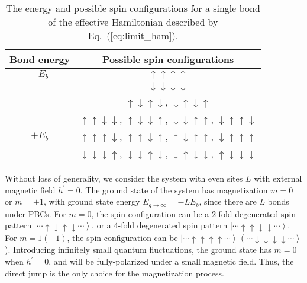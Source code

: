 \documentclass[article,10pt,onecolumn,superscriptaddress,floatfix]{revtex4}
\begin{document}
\begin{table}
\centering
\begin{tabular}{c|c}
\hline
Bond energy & Possible spin configurations \tabularnewline
\hline
\hline
$-E_{b}$ & $\uparrow\uparrow\uparrow\uparrow$ \tabularnewline
\cline{2-2}
 & $\downarrow\downarrow\downarrow\downarrow$\tabularnewline
\cline{2-2}
 & $\uparrow\downarrow\uparrow\downarrow$, $\downarrow\uparrow\downarrow\uparrow$\tabularnewline
\cline{2-2}
 & $\uparrow\uparrow\downarrow\downarrow$, $\uparrow\downarrow\downarrow\uparrow$, $\downarrow\downarrow\uparrow\uparrow$, $\downarrow\uparrow\uparrow\downarrow$\tabularnewline
\hline
$+E_{b}$ & $\uparrow\uparrow\uparrow\downarrow$, $\uparrow\uparrow\downarrow\uparrow$, $\uparrow\downarrow\uparrow\uparrow$, $\downarrow\uparrow\uparrow\uparrow$\tabularnewline
\cline{2-2}
 & $\downarrow\downarrow\downarrow\uparrow$, $\downarrow\downarrow\uparrow\downarrow$, $\downarrow\uparrow\downarrow\downarrow$, $\uparrow\downarrow\downarrow\downarrow$\tabularnewline
\hline
\end{tabular}
\caption{The energy and possible spin configurations for a single bond of the effective Hamiltonian described by Eq.~(\ref{eq:limit_ham}). }
\label{table:bond}
\end{table}

Without loss of generality, we consider the system with even sites $L$ with external magnetic field $h^{\prime}=0$. The ground state of the system has magnetization $m=0$ or $m=\pm1$, with ground state energy $E_{g\rightarrow\infty}=-L E_b$, since there are $L$ bonds under PBCs. For $m=0$, the spin configuration can be a 2-fold degenerated spin pattern $\left|\cdots\uparrow\downarrow\uparrow\downarrow\cdots\right\rangle$, or a 4-fold degenerated spin pattern $\left|\cdots\uparrow\uparrow\downarrow\downarrow\cdots\right\rangle$. For $m=1(-1)$, the spin configuration can be $\left|\cdots\uparrow\uparrow\uparrow\uparrow\cdots\right\rangle$ ($\left|\cdots\downarrow\downarrow\downarrow\downarrow\cdots\right\rangle$). Introducing infinitely small quantum fluctuations, the ground state has $m=0$ when $h^{\prime}=0$, and will be fully-polarized under a small magnetic field. Thus, the direct jump is  the only choice for the magnetization process.
\end{document}
